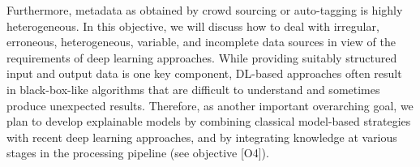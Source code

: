 \documentclass[11pt,a4paper]{article}
\newcommand{\meinard}[1]{{\color{red} #1}}
\theoremstyle{plain} \newtheorem{define}{Definition}[section]
\begin{document}
{\begin{enumerate}
%
Furthermore, metadata as obtained by crowd sourcing or auto-tagging is highly heterogeneous. In this objective, we will discuss how to deal with irregular, erroneous, heterogeneous, variable, and incomplete data sources in view of the requirements of deep learning approaches.
%
%
While providing suitably structured input and output data is one key component, DL-based approaches often result in black-box-like algorithms that are difficult to understand and sometimes produce unexpected results.
%
%
%
Therefore, as another important overarching goal, we plan to develop explainable models by combining classical model-based strategies with recent deep learning approaches, and by integrating knowledge at various stages in the processing pipeline (see objective [O4]).
%
%
%
%
\end{enumerate}

}
\end{document}
